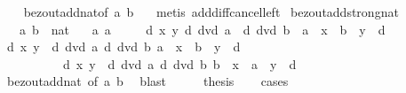 \begin{isabellebody}
%
\isadelimproof
\ \ %
\endisadelimproof
%
\isatagproof
{}\isamarkupfalse%
\ bezout{\isacharunderscore}{\kern0pt}add{\isacharunderscore}{\kern0pt}nat{\isacharbrackleft}{\kern0pt}of\ a\ b{\isacharbrackright}{\kern0pt}\ \ \isamarkupfalse%
\ {\isacharparenleft}{\kern0pt}metis\ add{\isacharunderscore}{\kern0pt}diff{\isacharunderscore}{\kern0pt}cancel{\isacharunderscore}{\kern0pt}left{\isacharprime}{\kern0pt}{\isacharparenright}{\kern0pt}%
\endisatagproof
{\isafoldproof}%
%
\isadelimproof
\isanewline
%
\endisadelimproof
\isanewline
{}\isamarkupfalse%
\ bezout{\isacharunderscore}{\kern0pt}add{\isacharunderscore}{\kern0pt}strong{\isacharunderscore}{\kern0pt}nat{\isacharcolon}{\kern0pt}\isanewline
\ \ \ a\ b\ {\isacharcolon}{\kern0pt}{\isacharcolon}{\kern0pt}\ nat\isanewline
\ \ \ a{\isacharcolon}{\kern0pt}\ {\isachardoublequoteopen}a\ {\isasymnoteq}\ {}{\isachardoublequoteclose}\isanewline
\ \ \ {\isachardoublequoteopen}{\isasymexists}d\ x\ y{\isachardot}{\kern0pt}\ d\ dvd\ a\ {\isasymand}\ d\ dvd\ b\ {\isasymand}\ a\ {\isacharasterisk}{\kern0pt}\ x\ {\isacharequal}{\kern0pt}\ b\ {\isacharasterisk}{\kern0pt}\ y\ {\isacharplus}{\kern0pt}\ d{\isachardoublequoteclose}\isanewline
%
\isadelimproof
%
\endisadelimproof
%
\isatagproof
{}\isamarkupfalse%
\ {\isacharminus}{\kern0pt}\isanewline
\ \ \isamarkupfalse%
\ d\ x\ y\ \ {\isachardoublequoteopen}d\ dvd\ a{\isachardoublequoteclose}\ {\isachardoublequoteopen}d\ dvd\ b{\isachardoublequoteclose}\ {\isachardoublequoteopen}a\ {\isacharasterisk}{\kern0pt}\ x\ {\isacharequal}{\kern0pt}\ b\ {\isacharasterisk}{\kern0pt}\ y\ {\isacharplus}{\kern0pt}\ d{\isachardoublequoteclose}\isanewline
\ \ \ \ \ \ \ \ \ {\isacharbar}{\kern0pt}\ d\ x\ y\ \ {\isachardoublequoteopen}d\ dvd\ a{\isachardoublequoteclose}\ {\isachardoublequoteopen}d\ dvd\ b{\isachardoublequoteclose}\ {\isachardoublequoteopen}b\ {\isacharasterisk}{\kern0pt}\ x\ {\isacharequal}{\kern0pt}\ a\ {\isacharasterisk}{\kern0pt}\ y\ {\isacharplus}{\kern0pt}\ d{\isachardoublequoteclose}\isanewline
\ \ \ \ \isamarkupfalse%
\ bezout{\isacharunderscore}{\kern0pt}add{\isacharunderscore}{\kern0pt}nat\ {\isacharbrackleft}{\kern0pt}of\ a\ b{\isacharbrackright}{\kern0pt}\ \isamarkupfalse%
\ blast\isanewline
\ \ \isamarkupfalse%
\ \isamarkupfalse%
\ {\isacharquery}{\kern0pt}thesis\isanewline
\ \ \isamarkupfalse%
\ cases\isanewline

\end{isabellebody}
